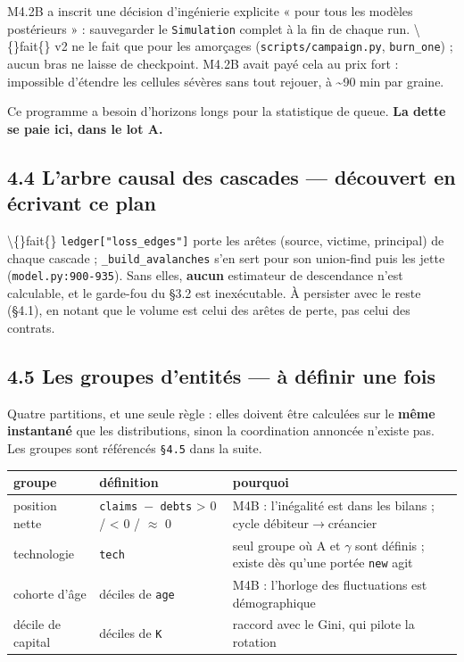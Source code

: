 \documentclass[11pt,a4paper]{article}
\newcommand{\code}[1]{\texttt{#1}}
\begin{document}
M4.2B a inscrit une décision d'ingénierie explicite « pour tous les modèles postérieurs » : sauvegarder le \code{Simulation} complet à la fin de chaque run. \textbackslash\{\}fait\{\} v2 ne le fait que pour les amorçages (\code{scripts/campaign.py}, \code{burn\_one}) ; aucun bras ne laisse de checkpoint. M4.2B avait payé cela au prix fort : impossible d'étendre les cellules sévères sans tout rejouer, à \textasciitilde{}90 min par graine.

Ce programme a besoin d'horizons longs pour la statistique de queue. \textbf{La dette se paie ici, dans le lot A.}

\subsection*{4.4 L'arbre causal des cascades --- découvert en écrivant ce plan}

\textbackslash\{\}fait\{\} \code{ledger["loss\_edges"]} porte les arêtes (source, victime, principal) de chaque cascade ; \code{\_build\_avalanches} s'en sert pour son union-find puis les jette (\code{model.py:900-935}). Sans elles, \textbf{aucun} estimateur de descendance n'est calculable, et le garde-fou du §3.2 est inexécutable. À persister avec le reste (§4.1), en notant que le volume est celui des arêtes de perte, pas celui des contrats.

\subsection*{4.5 Les groupes d'entités --- à définir une fois}

Quatre partitions, et une seule règle : elles doivent être calculées sur le \textbf{même instantané} que les distributions, sinon la coordination annoncée n'existe pas. Les groupes sont référencés \code{§4.5} dans la suite.

\begin{center}
\begin{tabularx}{\linewidth}{@{}lXX@{}}
\toprule
\textbf{groupe} & \textbf{définition} & \textbf{pourquoi} \\
\midrule
position nette & \code{claims \ensuremath{-} debts} > 0 / < 0 / \ensuremath{\approx} 0 & M4B : l'inégalité est dans les bilans ; cycle débiteur\ensuremath{\rightarrow}créancier \\
technologie & \code{tech} & seul groupe où A et \ensuremath{\gamma} sont définis ; existe dès qu'une portée \code{new} agit \\
cohorte d'âge & déciles de \code{age} & M4B : l'horloge des fluctuations est démographique \\
décile de capital & déciles de \code{K} & raccord avec le Gini, qui pilote la rotation \\
\bottomrule
\end{tabularx}
\end{center}
\end{document}
